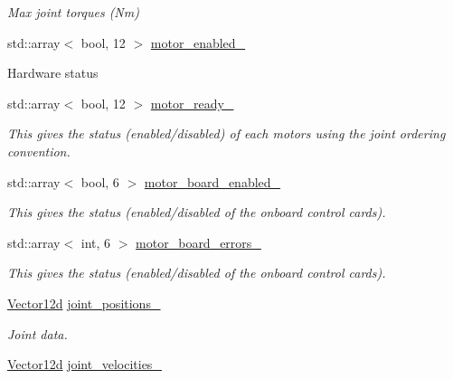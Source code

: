 \begin{DoxyCompactItemize}
\begin{DoxyCompactList}\small\item\em Max joint torques (Nm) \end{DoxyCompactList}\item 
std\+::array$<$ bool, 12 $>$ \hyperlink{classblmc__robots_1_1Solo12_a50b6c097724e01436424b1f1c8dd0dd2}{motor\+\_\+enabled\+\_\+}
\begin{DoxyCompactList}\small\item\em 

 Hardware status \end{DoxyCompactList}\item 
std\+::array$<$ bool, 12 $>$ \hyperlink{classblmc__robots_1_1Solo12_a653320521b1f1833edf592b5f89cc3a8}{motor\+\_\+ready\+\_\+}\hypertarget{classblmc__robots_1_1Solo12_a653320521b1f1833edf592b5f89cc3a8}{}\label{classblmc__robots_1_1Solo12_a653320521b1f1833edf592b5f89cc3a8}

\begin{DoxyCompactList}\small\item\em This gives the status (enabled/disabled) of each motors using the joint ordering convention. \end{DoxyCompactList}\item 
std\+::array$<$ bool, 6 $>$ \hyperlink{classblmc__robots_1_1Solo12_a33269cf4037c0a3812fe8127dcf65976}{motor\+\_\+board\+\_\+enabled\+\_\+}\hypertarget{classblmc__robots_1_1Solo12_a33269cf4037c0a3812fe8127dcf65976}{}\label{classblmc__robots_1_1Solo12_a33269cf4037c0a3812fe8127dcf65976}

\begin{DoxyCompactList}\small\item\em This gives the status (enabled/disabled of the onboard control cards). \end{DoxyCompactList}\item 
std\+::array$<$ int, 6 $>$ \hyperlink{classblmc__robots_1_1Solo12_af08cfab9b12464b12d2991c0b3376631}{motor\+\_\+board\+\_\+errors\+\_\+}\hypertarget{classblmc__robots_1_1Solo12_af08cfab9b12464b12d2991c0b3376631}{}\label{classblmc__robots_1_1Solo12_af08cfab9b12464b12d2991c0b3376631}

\begin{DoxyCompactList}\small\item\em This gives the status (enabled/disabled of the onboard control cards). \end{DoxyCompactList}\item 
\hyperlink{common__header_8hpp_a80313eb420184518596e745eecf4b494}{Vector12d} \hyperlink{classblmc__robots_1_1Solo12_a30531d872c6de968876110416ce777a9}{joint\+\_\+positions\+\_\+}
\begin{DoxyCompactList}\small\item\em Joint data. \end{DoxyCompactList}\item 
\hyperlink{common__header_8hpp_a80313eb420184518596e745eecf4b494}{Vector12d} \hyperlink{classblmc__robots_1_1Solo12_af9b0cbb28848b50a3706316991d34cca}{joint\+\_\+velocities\+\_\+}\hypertarget{classblmc__robots_1_1Solo12_af9b0cbb28848b50a3706316991d34cca}{}\label{classblmc__robots_1_1Solo12_af9b0cbb28848b50a3706316991d34cca}


\end{DoxyCompactItemize}
